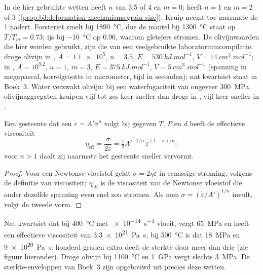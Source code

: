 In de hier gebruikte wetten heeft  $n$ van 3.5 of 4 en $m = 0$;
 heeft $n = 1$ en $m = 2$ of 3 (\cref{prop:b3:deformation-mechanisms:grain-size}).
Kruip neemt toe naarmate de  1 nadert. Forsteriet smelt bij \qty{1890}{\celsius}, dus de mantel bij \qty{1300}{\celsius}
staat op $T/T_m = 0.73$; ijs bij \qty{-10}{\celsius} op 0.96, waarom
gletsjers stromen. De olivijnwaarden die hier worden gebruikt, zijn die van een veelgebruikte
laboratoriumcompilatie: droge olivijn in , $A =
\num{1.1e5}$, $n = 3.5$, $E = \qty{530}{kJ.mol^{-1}}$, $V =
\qty{14}{cm^3.mol^{-1}}$; in , $A = 10^{9.2}$, $n = 1$, $m = 3$,
$E = \qty{375}{kJ.mol^{-1}}$, $V = \qty{5}{cm^3.mol^{-1}}$ (spanning in megapascal,
korrelgrootte in micrometer, tijd in seconden); nat kwartsiet staat in
Boek~3. Water verzwakt olivijn: bij een waterfugaciteit van ongeveer
\qty{300}{MPa}, olivijnaggregaten kruipen vijf tot zes keer sneller dan droge
in , vijf keer sneller in .

\begin{proposition}\label{prop:b3:deformation-mechanisms:viscosity}
Een gesteente dat een  $\dot\varepsilon = A'\sigma^n$ volgt bij gegeven $T$, $P$ en
$d$ heeft de effectieve viscositeit
\[
  \eta_{\mathrm{eff}} = \frac{\sigma}{2\dot\varepsilon}
  = \tfrac12A'^{-1/n}\,\dot\varepsilon^{(1-n)/n}:
\]
voor $n > 1$ daalt zij naarmate het gesteente sneller vervormt.
\end{proposition}

\begin{proof}
Voor een Newtonse vloeistof geldt $\sigma = 2\eta\dot\varepsilon$ in eenassige stroming, volgens de
definitie van viscositeit; $\eta_{\mathrm{eff}}$ is de viscositeit van de Newtonse
vloeistof die onder dezelfde spanning even snel zou stromen. Als men
$\sigma = (\dot\varepsilon/A')^{1/n}$ invult, volgt de tweede vorm.
\end{proof}

Nat kwartsiet dat bij \qty{400}{\celsius} met \qty{e-14}{s^{-1}} vloeit, vergt
\qty{65}{MPa} en heeft een effectieve viscositeit van \qty{3.3e21}{Pa.s}; bij
\qty{500}{\celsius} is dat \qty{18}{MPa} en \qty{9e20}{Pa.s}: honderd graden
extra deelt de sterkte door meer dan drie (zie figuur hieronder). Droge olivijn bij
\qty{1100}{\celsius} en \qty{1}{GPa} vergt slechts \qty{3}{MPa}.
De sterkte-enveloppen van Boek~3 zijn opgebouwd uit precies deze wetten.

